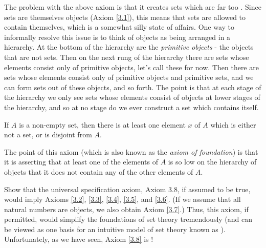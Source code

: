 The problem with the above axiom is that it creates sets which are far too .
Since sets are themselves objects (Axiom \ref{3.1}), this means that sets are allowed to contain themselves, which is a somewhat silly state of affairs.
One way to informally resolve this issue is to think of objects as being arranged in a hierarchy.
At the bottom of the hierarchy are the \emph{primitive objects} - the objects that are not sets.
Then on the next rung of the hierarchy there are sets whose elements consist only of primitive objects, let’s call these  for now.
Then there are sets whose elements consist only of primitive objects and primitive sets, and we can form sets out of these objects, and so forth.
The point is that at each stage of the hierarchy we only see sets whose elements consist of objects at lower stages of the hierarchy, and so at no stage do we ever construct a set which contains itself.

\begin{axiom}[Regularity]\label{3.9}
If \(A\) is a non-empty set, then there is at least one element \(x\) of \(A\) which is either not a set, or is disjoint from \(A\).
\end{axiom}

The point of this axiom (which is also known as the \emph{axiom of foundation}) is that it is asserting that at least one of the elements of \(A\) is so low on the hierarchy of objects that it does not contain any of the other elements of \(A\).

\begin{exercise}\label{exercise 3.2.1}
Show that the universal specification axiom, Axiom 3.8, if assumed to be true, would imply Axioms \ref{3.2}, \ref{3.3}, \ref{3.4}, \ref{3.5}, and \ref{3.6}.
(If we assume that all natural numbers are objects, we also obtain Axiom \ref{3.7}.)
Thus, this axiom, if permitted, would simplify the foundations of set theory tremendously (and can be viewed as one basis for an intuitive model of set theory known as ).
Unfortunately, as we have seen, Axiom \ref{3.8} is !
\end{exercise}

